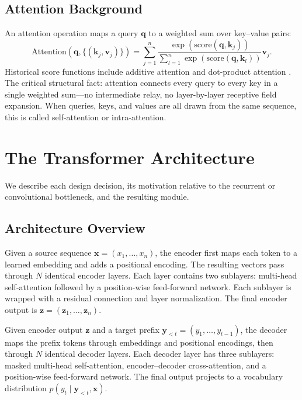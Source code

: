 ﻿\documentclass{article}
\begin{document}
\subsection{Attention Background}

An attention operation maps a query $\mathbf{q}$ to a weighted sum over key--value pairs:
\begin{equation}
\text{Attention}(\mathbf{q}, \{(\mathbf{k}_j, \mathbf{v}_j)\}) = \sum_{j=1}^{n} \frac{\exp(\text{score}(\mathbf{q}, \mathbf{k}_j))}{\sum_{l=1}^{n} \exp(\text{score}(\mathbf{q}, \mathbf{k}_l))} \mathbf{v}_j.
\end{equation}
Historical score functions include additive attention \citep{bahdanau2015neural} and dot-product attention \citep{luong2015effective}. The critical structural fact: attention connects every query to every key in a single weighted sum---no intermediate relay, no layer-by-layer receptive field expansion. When queries, keys, and values are all drawn from the same sequence, this is called self-attention or intra-attention.

\section{The Transformer Architecture}

We describe each design decision, its motivation relative to the recurrent or convolutional bottleneck, and the resulting module.

\subsection{Architecture Overview}

Given a source sequence $\mathbf{x} = (x_1, \ldots, x_n)$, the encoder first maps each token to a learned embedding and adds a positional encoding. The resulting vectors pass through $N$ identical encoder layers. Each layer contains two sublayers: multi-head self-attention followed by a position-wise feed-forward network. Each sublayer is wrapped with a residual connection and layer normalization. The final encoder output is $\mathbf{z} = (\mathbf{z}_1, \ldots, \mathbf{z}_n)$.

Given encoder output $\mathbf{z}$ and a target prefix $\mathbf{y}_{<t} = (y_1, \ldots, y_{t-1})$, the decoder maps the prefix tokens through embeddings and positional encodings, then through $N$ identical decoder layers. Each decoder layer has three sublayers: masked multi-head self-attention, encoder--decoder cross-attention, and a position-wise feed-forward network. The final output projects to a vocabulary distribution $p(y_t \mid \mathbf{y}_{<t}, \mathbf{x})$.
\end{document}
